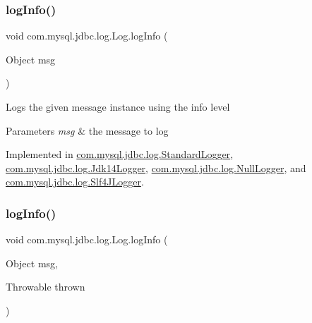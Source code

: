 \subsubsection{\texorpdfstring{log\+Info()}{logInfo()}\hspace{0.1cm}{\footnotesize\ttfamily [1/2]}}
{\footnotesize\ttfamily void com.\+mysql.\+jdbc.\+log.\+Log.\+log\+Info (\begin{DoxyParamCaption}\item[{Object}]{msg }\end{DoxyParamCaption})}

Logs the given message instance using the \textquotesingle{}info\textquotesingle{} level


\begin{DoxyParams}{Parameters}
{\em msg} & the message to log \\
\hline
\end{DoxyParams}


Implemented in \mbox{\hyperlink{classcom_1_1mysql_1_1jdbc_1_1log_1_1_standard_logger_ac3056a38def26fc68c472fd56c6cfcab}{com.\+mysql.\+jdbc.\+log.\+Standard\+Logger}}, \mbox{\hyperlink{classcom_1_1mysql_1_1jdbc_1_1log_1_1_jdk14_logger_ad10df21ceab0fe74659381483cc45ebb}{com.\+mysql.\+jdbc.\+log.\+Jdk14\+Logger}}, \mbox{\hyperlink{classcom_1_1mysql_1_1jdbc_1_1log_1_1_null_logger_afa227f49b4d9992c7e4393e278dc1a77}{com.\+mysql.\+jdbc.\+log.\+Null\+Logger}}, and \mbox{\hyperlink{classcom_1_1mysql_1_1jdbc_1_1log_1_1_slf4_j_logger_a383e3eb38412b93808048a0df9f74083}{com.\+mysql.\+jdbc.\+log.\+Slf4\+J\+Logger}}.

\mbox{\label{interfacecom_1_1mysql_1_1jdbc_1_1log_1_1_log_a577190d2919e07471dcd29d57eebee30}} 
\subsubsection{\texorpdfstring{log\+Info()}{logInfo()}\hspace{0.1cm}{\footnotesize\ttfamily [2/2]}}
{\footnotesize\ttfamily void com.\+mysql.\+jdbc.\+log.\+Log.\+log\+Info (\begin{DoxyParamCaption}\item[{Object}]{msg,  }\item[{Throwable}]{thrown }\end{DoxyParamCaption})}

